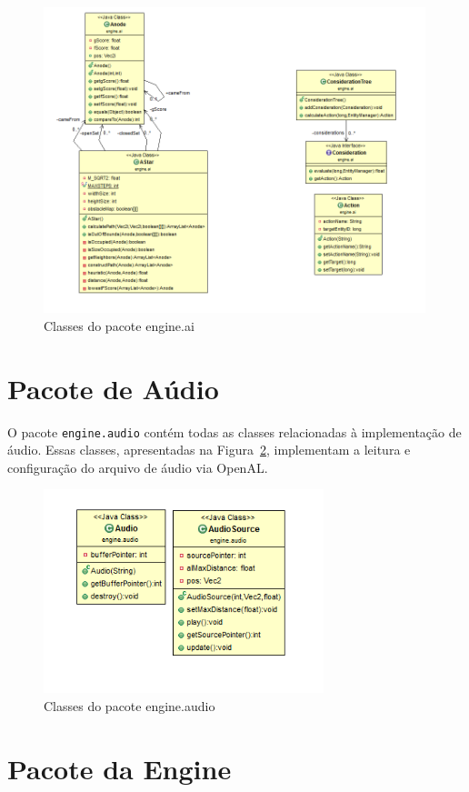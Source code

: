 \documentclass[12pt, 
openright, 
oneside, 
a4paper,    
brazil]{facom-ufu-abntex2}
\begin{document}
\begin{figure}[H]
	\centering
	\includegraphics[width=30em]{imagens/engine.ai.png}
	\caption{Classes do pacote engine.ai\label{fig:eng.ai}}
\end{figure}

\section{Pacote de Aúdio}

O pacote \texttt{engine.audio} contém todas as classes relacionadas à implementação de áudio. Essas classes, apresentadas na Figura~\ref{fig:eng.au}, implementam a leitura e configuração do arquivo de áudio via OpenAL.

\begin{figure}[H]
	\centering
	\includegraphics[width=22em]{imagens/engine.audio.png}
	\caption{Classes do pacote engine.audio\label{fig:eng.au}}
\end{figure}

\section{Pacote da Engine}
\end{document}
